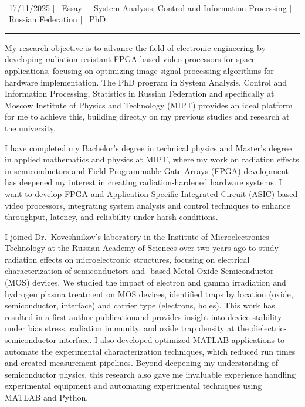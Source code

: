 \documentclass[a4paper,12pt]{article}
\begin{document}
\begin{center}
    {\Huge \scshape {\fontsize{25}{30}\selectfont{Reza}} {\fontsize{25}{30}}} \\ \vspace{3pt}
    {\small \raisebox{-0.2\height}\ {17/11/2025}} $|$
    {\small \raisebox{-0.2\height}\ {Essay}} $|$
    {\small \raisebox{-0.2\height}\ {System Analysis, Control and Information Processing}} $|$
    {\small \raisebox{-0.2\height}\ {Russian Federation}} $|$
    {\small \raisebox{-0.2\height}\ {PhD}}
    \vspace{-10pt}
\end{center}
\vspace{-10pt}
\noindent\rule{\textwidth}{0.5pt}

My research objective is to advance the field of electronic engineering by developing radiation-resistant FPGA based video processors for space applications, focusing on optimizing image signal processing algorithms for hardware implementation. The PhD program in System Analysis, Control and Information Processing, Statistics in Russian Federation and specifically at Moscow Institute of Physics and Technology (MIPT) provides an ideal platform for me to achieve this, building directly on my previous studies and research at the university.
\vspace{10pt}

I have completed my Bachelor's degree in technical physics and Master's degree in applied mathematics and physics at MIPT, where my work on radiation effects in semiconductors and Field Programmable Gate Arrays (FPGA) development has deepened my interest in creating radiation-hardened hardware systems. I want to develop FPGA and Application-Specific Integrated Circuit (ASIC) based video processors, integrating system analysis and control techniques to enhance throughput, latency, and reliability under harsh conditions.
\vspace{10pt}

I joined Dr.\ Koveshnikov's laboratory in the Institute of Microelectronics Technology at the Russian Academy of Sciences over two years ago to study radiation effects on microelectronic structures, focusing on electrical characterization of semiconductors and -based Metal-Oxide-Semiconductor (MOS) devices. We studied the impact of electron and gamma irradiation and hydrogen plasma treatment on MOS devices, identified traps by location (oxide, semiconductor, interface) and carrier type (electrons, holes). This work has resulted in a first author publication\footnotemark[1] and provides insight into device stability under bias stress, radiation immunity, and oxide trap density at the dielectric-semiconductor interface. I also developed optimized MATLAB applications to automate the experimental characterization techniques, which reduced run times and created measurement pipelines. Beyond deepening my understanding of semiconductor physics, this research also gave me invaluable experience handling experimental equipment and automating experimental techniques using MATLAB and Python.
\vspace{10pt}
\end{document}
